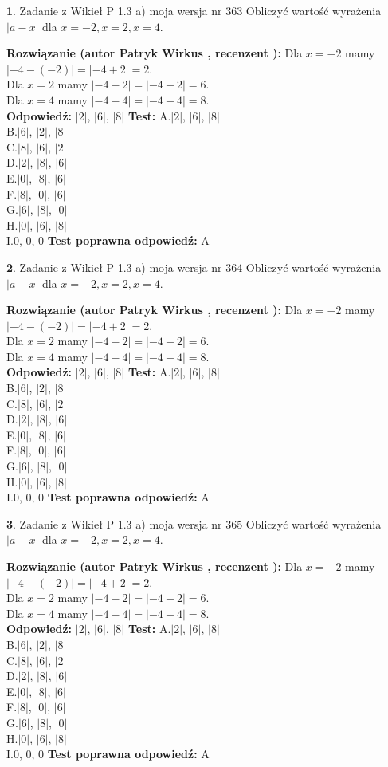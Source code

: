 \documentclass[12pt, a4paper]{article}
\theoremstyle{definition} %
\newtheorem{zad}{}
\newcommand{\zadStart}[1]{\begin{zad}#1\newline}
\newcommand{\zadStop}{\end{zad}}
\newcommand{\rozwStart}[2]{\noindent \textbf{Rozwiązanie (autor #1 , recenzent #2): }\newline}
\newcommand{\rozwStop}{\newline}
\newcommand{\odpStart}{\noindent \textbf{Odpowiedź:}\newline}
\newcommand{\odpStop}{\newline}
\newcommand{\testStart}{\noindent \textbf{Test:}\newline}
\newcommand{\testStop}{\newline}
\newcommand{\kluczStart}{\noindent \textbf{Test poprawna odpowiedź:}\newline}
\newcommand{\kluczStop}{\newline}
\begin{document}
\zadStart{Zadanie z Wikieł P 1.3 a) moja wersja nr 363}
Obliczyć wartość wyrażenia $|a - x|$ dla $x=-2,x=2,x=4$.
\zadStop
\rozwStart{Patryk Wirkus}{}
Dla $x = -2$ mamy $|-4 - (-2)| = |-4 + 2| = 2$.\\
Dla $x = 2$ mamy $|-4 - 2| = |-4 - 2| = 6$.\\
Dla $x = 4$ mamy $|-4 - 4| = |-4 - 4| = 8$.\\
\rozwStop
\odpStart
$|2|$, $|6|$, $|8|$
\odpStop
\testStart
A.$|2|$, $|6|$, $|8|$\\
B.$|6|$, $|2|$, $|8|$\\
C.$|8|$, $|6|$, $|2|$\\
D.$|2|$, $|8|$, $|6|$\\
E.$|0|$, $|8|$, $|6|$\\
F.$|8|$, $|0|$, $|6|$\\
G.$|6|$, $|8|$, $|0|$\\
H.$|0|$, $|6|$, $|8|$\\
I.$0$, $0$, $0$
\testStop
\kluczStart
A
\kluczStop



\zadStart{Zadanie z Wikieł P 1.3 a) moja wersja nr 364}
Obliczyć wartość wyrażenia $|a - x|$ dla $x=-2,x=2,x=4$.
\zadStop
\rozwStart{Patryk Wirkus}{}
Dla $x = -2$ mamy $|-4 - (-2)| = |-4 + 2| = 2$.\\
Dla $x = 2$ mamy $|-4 - 2| = |-4 - 2| = 6$.\\
Dla $x = 4$ mamy $|-4 - 4| = |-4 - 4| = 8$.\\
\rozwStop
\odpStart
$|2|$, $|6|$, $|8|$
\odpStop
\testStart
A.$|2|$, $|6|$, $|8|$\\
B.$|6|$, $|2|$, $|8|$\\
C.$|8|$, $|6|$, $|2|$\\
D.$|2|$, $|8|$, $|6|$\\
E.$|0|$, $|8|$, $|6|$\\
F.$|8|$, $|0|$, $|6|$\\
G.$|6|$, $|8|$, $|0|$\\
H.$|0|$, $|6|$, $|8|$\\
I.$0$, $0$, $0$
\testStop
\kluczStart
A
\kluczStop



\zadStart{Zadanie z Wikieł P 1.3 a) moja wersja nr 365}
Obliczyć wartość wyrażenia $|a - x|$ dla $x=-2,x=2,x=4$.
\zadStop
\rozwStart{Patryk Wirkus}{}
Dla $x = -2$ mamy $|-4 - (-2)| = |-4 + 2| = 2$.\\
Dla $x = 2$ mamy $|-4 - 2| = |-4 - 2| = 6$.\\
Dla $x = 4$ mamy $|-4 - 4| = |-4 - 4| = 8$.\\
\rozwStop
\odpStart
$|2|$, $|6|$, $|8|$
\odpStop
\testStart
A.$|2|$, $|6|$, $|8|$\\
B.$|6|$, $|2|$, $|8|$\\
C.$|8|$, $|6|$, $|2|$\\
D.$|2|$, $|8|$, $|6|$\\
E.$|0|$, $|8|$, $|6|$\\
F.$|8|$, $|0|$, $|6|$\\
G.$|6|$, $|8|$, $|0|$\\
H.$|0|$, $|6|$, $|8|$\\
I.$0$, $0$, $0$
\testStop
\kluczStart
A
\kluczStop
\end{document}
